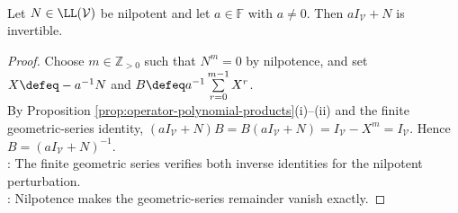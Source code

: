\begin{lemma} \label{lem:scalar-plus-nilpotent-invertible} \\
Let $N\in\LL(\mathcal{V})$ be nilpotent and let $a\in\mathbb{F}$ with $a\neq0$. Then $aI_{\mathcal{V}}+N$ is invertible.
\begin{proof}
Choose $m\in\mathbb{Z}_{>0}$ such that $N^m=0$ by nilpotence, and set $X\defeq-a^{-1}N$ and $B\defeq a^{-1}\sum\limits_{r=0}^{m-1}X^r$.\\
By Proposition \ref{prop:operator-polynomial-products}(i)--(ii) and the finite geometric-series identity, $(aI_{\mathcal{V}}+N)B=B(aI_{\mathcal{V}}+N)=I_{\mathcal{V}}-X^m=I_{\mathcal{V}}$. Hence $B=(aI_{\mathcal{V}}+N)^{-1}$.\\
: The finite geometric series verifies both inverse identities for the nilpotent perturbation.\\
: Nilpotence makes the geometric-series remainder vanish exactly.
\end{proof}
\end{lemma}

